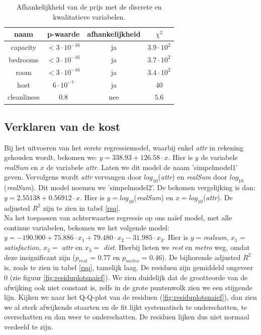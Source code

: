 \documentclass[a4paper]{kulakarticle}
\begin{document}
	\begin{table}[h]
		\centering
		\begin{tabular}{c|c|c|c }
			naam & p-waarde & afhankelijkheid & $\chi ^2$\\
			\hline
			\hline
			capacity & $< 3 \cdot 10^{-16}$ & ja& $3.9 \cdot 10^{2}$ \\ 
			bedrooms & $< 3 \cdot 10^{-16}$ & ja& $3.7  \cdot 10^{2}$ \\
			room & $< 3 \cdot 10^{-16}$ & ja& $ 3.4 \cdot 10^{2}$ \\
			host & $ 6 \cdot 10^{-7}$ & ja& $40$ \\
			cleanliness & $0.8$ &nee& $5.6$ \\
		\end{tabular}
		\caption{Afhankelijkheid van de prijs met de discrete en kwalitatieve variabelen.}
		\label{discrete variabelen afhankelijkheid}
	\end{table}
	
	\subsection{Verklaren van de kost}
	
	Bij het uitvoeren van het eerste regressiemodel, waarbij enkel \textit{attr} in rekening gehouden wordt, bekomen we: 
    $ y = 338.93 + 126.58\cdot x$. Hier is $y$ de variabele \textit{realSum} en $x$ de variabele \textit{attr}. Laten we dit model de naam 'simpelmodel1' geven. Vervolgens wordt \textit{attr} vervangen door $log_{10}$(\textit{attr}) en \textit{realSum} door $log_{10}$(\textit{realSum}). Dit model noemen we 'simpelmodel2'. De bekomen vergelijking is dan: $ y = 2.55138 + 0.56912\cdot x$. Hier is $y = log_{10}$(\textit{realSum}) en $x = log_{10}$(\textit{attr}). De adjusted $R^2$ zijn te zien in tabel \ref{rsq}.\\
	Na het toepassen van achterwaartse regressie op ons naïef model, met alle continue variabelen, bekomen we het volgende model: $y = -190.900 + 75.886\cdot x_1 + 79.480\cdot x_2 -31.985\cdot x_3$. Hier is $y =$\textit{realsum}, $x_1 = $ \textit{satisfaction}, $x_2 =$ \textit{attr} en $x_3 =$ \textit{dist}. Hierbij lieten we \textit{rest} en \textit{metro} weg, omdat deze insignificant zijn ($p_{rest}$ = 0.77 en $p_{metro}$ = 0.46). De bijhorende adjusted $R^2$ is, zoals te zien in tabel \ref{rsq}, tamelijk laag. De residuen zijn gemiddeld ongeveer 0 (zie figuur \ref{fig:residuplotsnaief}). We zien duidelijk dat de grootteorde van de afwijking ook niet constant is, zelfs in de grote puntenwolk zien we een stijgende lijn. Kijken we naar het Q-Q-plot van de residuen (\ref{fig:residuplotsnaief}), dan zien we al sterk afwijkende staarten en de fit lijkt systematisch te onderschatten, te overschatten en dan weer te onderschatten. De residuen lijken dus niet normaal verdeeld te zijn. \\
	
\end{document}
